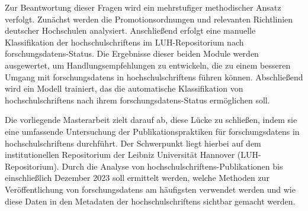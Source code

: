 Zur Beantwortung dieser Fragen wird ein mehrstufiger methodischer Ansatz verfolgt. Zunächst werden die Promotionsordnungen und relevanten Richtlinien deutscher Hochschulen analysiert. Anschließend erfolgt eine manuelle Klassifikation der \glspl{hochschulschriften} im LUH-Repositorium nach \glspl{forschungsdaten}-Status. Die Ergebnisse dieser beiden Module werden ausgewertet, um Handlungsempfehlungen zu entwickeln, die zu einem besseren Umgang mit \glspl{forschungsdaten} in \glspl{hochschulschriften} führen können. Abschließend wird ein Modell trainiert, das die automatische Klassifikation von \glspl{hochschulschriften} nach ihrem \glspl{forschungsdaten}-Status ermöglichen soll.

Die vorliegende Masterarbeit zielt darauf ab, diese Lücke zu schließen, indem sie eine umfassende Untersuchung der Publikationspraktiken für \glspl{forschungsdaten} in \glspl{hochschulschriften} durchführt. Der Schwerpunkt liegt hierbei auf dem institutionellen Repositorium der Leibniz Universität Hannover (LUH-Repositorium). Durch die Analyse von \glspl{hochschulschriften}-Publikationen bis einschließlich Dezember 2023 soll ermittelt werden, welche Methoden zur Veröffentlichung von \glspl{forschungsdaten} am häufigsten verwendet werden und wie diese Daten in den Metadaten der \glspl{hochschulschriften} sichtbar gemacht werden.

